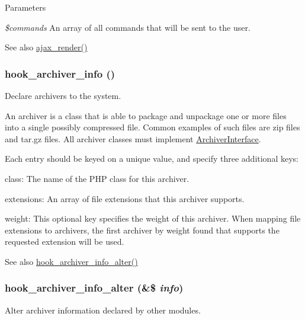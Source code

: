 \begin{DoxyParams}{Parameters}
\item[{\em \$commands}]An array of all commands that will be sent to the user.\end{DoxyParams}
\begin{DoxySeeAlso}{See also}
\hyperlink{group__ajax_ga241c2426bdde049c55b05b7bf5d714a2}{ajax\_\-render()} 
\end{DoxySeeAlso}
\hypertarget{group__hooks_ga1c5bd8d11e7d54242528f85434e5b260}{
\subsubsection[{hook\_\-archiver\_\-info}]{\setlength{\rightskip}{0pt plus 5cm}hook\_\-archiver\_\-info ()}}
\label{group__hooks_ga1c5bd8d11e7d54242528f85434e5b260}
Declare archivers to the system.

An archiver is a class that is able to package and unpackage one or more files into a single possibly compressed file. Common examples of such files are zip files and tar.gz files. All archiver classes must implement \hyperlink{interfaceArchiverInterface}{ArchiverInterface}.

Each entry should be keyed on a unique value, and specify three additional keys:
\begin{DoxyItemize}
\item class: The name of the PHP class for this archiver.
\item extensions: An array of file extensions that this archiver supports.
\item weight: This optional key specifies the weight of this archiver. When mapping file extensions to archivers, the first archiver by weight found that supports the requested extension will be used.
\end{DoxyItemize}

\begin{DoxySeeAlso}{See also}
\hyperlink{group__hooks_ga4e6f6f94acbd7a21c4a4a2cc6916356d}{hook\_\-archiver\_\-info\_\-alter()} 
\end{DoxySeeAlso}
\hypertarget{group__hooks_ga4e6f6f94acbd7a21c4a4a2cc6916356d}{
\subsubsection[{hook\_\-archiver\_\-info\_\-alter}]{\setlength{\rightskip}{0pt plus 5cm}hook\_\-archiver\_\-info\_\-alter (\&\$ {\em info})}}
\label{group__hooks_ga4e6f6f94acbd7a21c4a4a2cc6916356d}
Alter archiver information declared by other modules.

